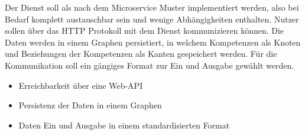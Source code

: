 Der Dienst soll als nach dem Microservice Muster implementiert werden, also bei Bedarf komplett austauschbar sein und wenige Abhängigkeiten enthalten. Nutzer sollen über das HTTP Protokoll mit dem Dienst kommunizieren können. Die Daten werden in einem Graphen persistiert, in welchem Kompetenzen als Knoten und Beziehungen der Kompetenzen als Kanten gespeichert werden. Für die Kommunikation soll ein gängiges Format zur Ein und Ausgabe gewählt werden.

\begin{itemize}
	\item Erreichbarkeit über eine Web-API 
	\item Persistenz der Daten in einem Graphen	
	\item Daten Ein und Ausgabe in einem standardisierten Format 
\end{itemize}



